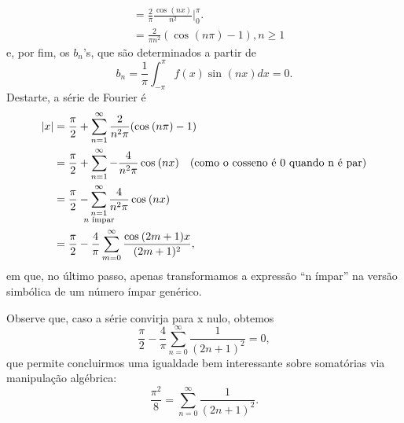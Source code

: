 \documentclass[../pde_notes.tex]{subfiles}
\begin{document}
\begin{example}
\begin{itemize}
\begin{align*}
			                                                                  & = \frac{2}{\pi }\frac{\cos^{}{(nx)}}{n^{2}}\biggl|_{0}^{\pi }\biggr.                                                       \\
			                                                                  & = \frac{2}{\pi n^{2}}(\cos^{}{(n\pi )}-1), n\geq 1
		      \end{align*}
		      e, por fim, os \(b_{n}\)'s, que são determinados a partir de
		      \[
			      b_{n} = \frac{1}{\pi }\int_{-\pi }^{\pi }f(x)\sin^{}{(nx)}dx = 0.
		      \]
		      Destarte, a série de Fourier é
		      \begin{align*}
			      |x| & = \frac{\pi }{2} + \sum\limits_{n=1}^{\infty}\frac{2}{n^{2}\pi}(\cos^{}{(n\pi )}-1)                                            \\
			          & = \frac{\pi }{2} + \sum\limits_{n=1}^{\infty}-\frac{4}{n^{2}\pi }\cos^{}{(nx)}\quad \text{(como o cosseno é 0 quando n é par)} \\
			          & = \frac{\pi }{2}-\sum\limits_{\mathclap{\substack{n=1                                                                          \\ n\text{ ímpar}}}}^{\infty}\frac{4}{n^{2}\pi }\cos^{}{(nx)}\\
			          & = \frac{\pi }{2} - \frac{4}{\pi }\sum\limits_{m=0}^{\infty}\frac{\cos^{}{(2m + 1)x}}{(2m+1)^{2}},
		      \end{align*}
		      em que, no último passo, apenas transformamos a expressão ``n ímpar'' na versão simbólica de um número ímpar genérico.

		      Observe que, caso a série convirja para x nulo, obtemos
		      \[
			      \frac{\pi }{2} - \frac{4}{\pi }\sum\limits_{n=0}^{\infty}\frac{1}{(2n+1)^{2}} = 0,
		      \]
		      que permite concluirmos uma igualdade bem interessante sobre somatórias via manipulação algébrica:
		      \[
			      \frac{\pi^{2} }{8} = \sum\limits_{n=0}^{\infty}\frac{1}{(2n+1)^{2}}.
		      \]
	\end{itemize}
\end{example}
\end{document}

